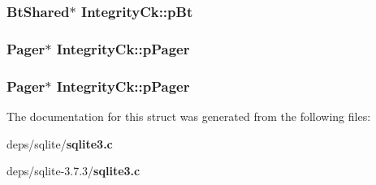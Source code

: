 \subsubsection{\setlength{\rightskip}{0pt plus 5cm}\bf{Bt\-Shared}$\ast$ \bf{Integrity\-Ck::p\-Bt}}\label{structIntegrityCk_fbc0d636410b59acb5d94b5734cb53db}


\subsubsection{\setlength{\rightskip}{0pt plus 5cm}\bf{Pager}$\ast$ \bf{Integrity\-Ck::p\-Pager}}\label{structIntegrityCk_8c819a93f4d8686163d4a976b4ad56ee}


\subsubsection{\setlength{\rightskip}{0pt plus 5cm}\bf{Pager}$\ast$ \bf{Integrity\-Ck::p\-Pager}}\label{structIntegrityCk_8c819a93f4d8686163d4a976b4ad56ee}




The documentation for this struct was generated from the following files:\begin{CompactItemize}
\item 
deps/sqlite/\bf{sqlite3.c}\item 
deps/sqlite-3.7.3/\bf{sqlite3.c}\end{CompactItemize}

